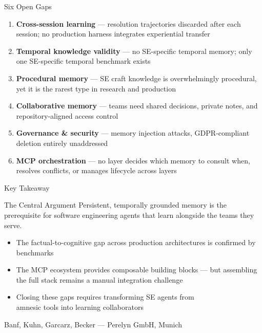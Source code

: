 \documentclass[aspectratio=169]{beamer}
\begin{document}
\begin{frame}{Six Open Gaps}
  \begin{enumerate}
    \item \textbf{Cross-session learning} --- resolution trajectories discarded after each session;
      no production harness integrates experiential transfer
    \item \textbf{Temporal knowledge validity} --- no SE-specific temporal memory;
      only one SE-specific temporal benchmark exists
    \item \textbf{Procedural memory} --- SE craft knowledge is overwhelmingly procedural,
      yet it is the rarest type in research and production
    \item \textbf{Collaborative memory} --- teams need shared decisions, private notes,
      and repository-aligned access control
    \item \textbf{Governance \& security} --- memory injection attacks, GDPR-compliant
      deletion entirely unaddressed
    \item \textbf{MCP orchestration} --- no layer decides which memory to consult when,
      resolves conflicts, or manages lifecycle across layers
  \end{enumerate}
\end{frame}

\begin{frame}{Key Takeaway}
  \begin{block}{The Central Argument}
    \alert{Persistent, temporally grounded memory} is the prerequisite for
    software engineering agents that learn alongside the teams they serve.
  \end{block}

  \vspace{0.4cm}

  \begin{itemize}
    \item The factual-to-cognitive gap across production architectures is confirmed by benchmarks
    \item The MCP ecosystem provides composable building blocks ---
      but assembling the full stack remains a manual integration challenge
    \item Closing these gaps requires transforming SE agents from\\
      \alert{amnesic tools} into \alert{learning collaborators}
  \end{itemize}

  \vspace{0.3cm}

  {\footnotesize Banf, Kuhn, Garcarz, Becker --- Perelyn GmbH, Munich}
\end{frame}
\end{document}
